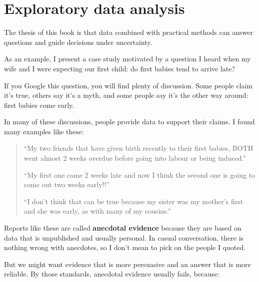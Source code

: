 \documentclass[12pt]{book}
\begin{document}
\normalsize

\clearemptydoublepage

\begin{latexonly}

\tableofcontents

\clearemptydoublepage

\end{latexonly}

\mainmatter


\chapter{Exploratory data analysis}
\label{intro}

The thesis of this book is that data combined with practical
methods can answer questions and guide decisions under uncertainty.

As an example, I present a case study motivated by a question
I heard when my wife and I were expecting our first child: do first
babies tend to arrive late?

If you Google this question, you will find plenty of discussion.  Some
people claim it's true, others say it's a myth, and some people say
it's the other way around: first babies come early.

In many of these discussions, people provide data to support their
claims.  I found many examples like these:

\begin{quote}

``My two friends that have given birth recently to their first babies,
BOTH went almost 2 weeks overdue before going into labour or being
induced.''

``My first one came 2 weeks late and now I think the second one is
going to come out two weeks early!!''

``I don't think that can be true because my sister was my mother's
first and she was early, as with many of my cousins.''

\end{quote}

Reports like these are called {\bf anecdotal evidence} because they
are based on data that is unpublished and usually personal.  In casual
conversation, there is nothing wrong with anecdotes, so I don't mean
to pick on the people I quoted.

But we might want evidence that is more persuasive and
an answer that is more reliable.  By those standards, anecdotal
evidence usually fails, because:
\end{document}
